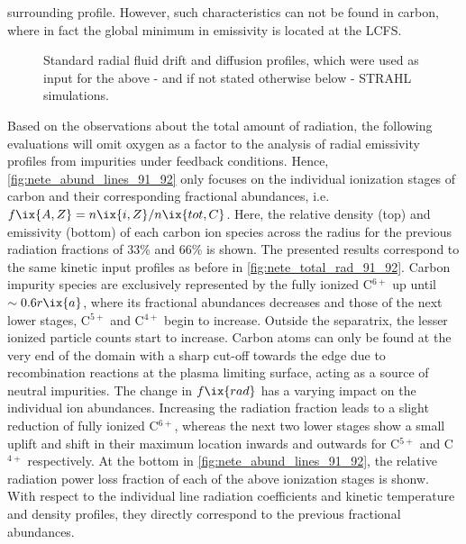 surrounding profile. However, such characteristics can not be found in carbon, where in fact the global minimum in emissivity is located at the LCFS.\\%
%
            \begin{figure}[t]%
                \centering%
                \captionsetup{width=.47\textwidth}%
                \begin{minipage}[b]{0.48\textwidth}%
                    \centering%
                \end{minipage}%
                \hfill%
                \begin{minipage}[b]{0.48\textwidth}%
                    \centering%
                    \caption{Standard radial fluid drift and diffusion profiles, which were used as input for the above - and if not stated otherwise below - STRAHL simulations.}\label{fig:fluid_coeffs}%
                \end{minipage}%
            \end{figure}%
%
            Based on the observations about the total amount of radiation, the following evaluations will omit oxygen as a factor to the analysis of radial emissivity profiles from impurities under feedback conditions. Hence, \cref{fig:nete_abund_lines_91_92} only focuses on the individual ionization stages of carbon and their corresponding fractional abundances, i.e. $f\ix{A,Z}=n\ix{i,Z}/n\ix{tot,C}$. Here, the relative density (top) and emissivity (bottom) of each carbon ion species across the radius for the previous radiation fractions of 33\% and 66\% is shown. The presented results correspond to the same kinetic input profiles as before in \cref{fig:nete_total_rad_91_92}. Carbon impurity species are exclusively represented by the fully ionized C$^{6+}$ up until $\sim0.6r\ix{a}$, where its fractional abundances decreases and those of the next lower stages, C$^{5+}$ and C$^{4+}$ begin to increase. Outside the separatrix, the lesser ionized particle counts start to increase. Carbon atoms can only be found at the very end of the domain with a sharp cut-off towards the edge due to recombination reactions at the plasma limiting surface, acting as a source of neutral impurities. The change in $f\ix{rad}$ has a varying impact on the individual ion abundances. Increasing the radiation fraction leads to a slight reduction of fully ionized C$^{6+}$, whereas the next two lower stages show a small uplift and shift in their maximum location inwards and outwards for C$^{5+}$ and C$^{4+}$ respectively. At the bottom in \cref{fig:nete_abund_lines_91_92}, the relative radiation power loss fraction of each of the above ionization stages is shonw. With respect to the individual line radiation coefficients and kinetic temperature and density profiles, they directly correspond to the previous fractional abundances.\\%
